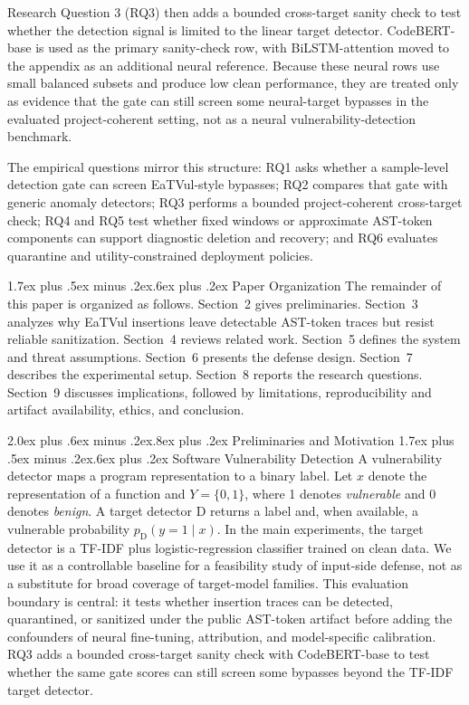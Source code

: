 \documentclass[letterpaper,twocolumn,10pt,twoside]{article}
\makeatletter
\renewcommand\section{\@startsection{section}{1}{\z@}%
  {2.0ex plus .6ex minus .2ex}{.8ex plus .2ex}%
  {\normalfont\large\bfseries}}
\renewcommand\subsection{\@startsection{subsection}{2}{\z@}%
  {1.7ex plus .5ex minus .2ex}{.6ex plus .2ex}%
  {\normalfont\normalsize\bfseries}}
\makeatother
\begin{document}
Research Question 3 (RQ3) then adds a bounded cross-target sanity check to test whether the detection signal is limited to the linear target detector. CodeBERT-base is used as the primary sanity-check row, with BiLSTM-attention moved to the appendix as an additional neural reference. Because these neural rows use small balanced subsets and produce low clean performance, they are treated only as evidence that the gate can still screen some neural-target bypasses in the evaluated project-coherent setting, not as a neural vulnerability-detection benchmark.

The empirical questions mirror this structure: RQ1 asks whether a sample-level detection gate can screen EaTVul-style bypasses; RQ2 compares that gate with generic anomaly detectors; RQ3 performs a bounded project-coherent cross-target check; RQ4 and RQ5 test whether fixed windows or approximate AST-token components can support diagnostic deletion and recovery; and RQ6 evaluates quarantine and utility-constrained deployment policies.

\subsection{Paper Organization}
The remainder of this paper is organized as follows. Section~2 gives preliminaries. Section~3 analyzes why EaTVul insertions leave detectable AST-token traces but resist reliable sanitization. Section~4 reviews related work. Section~5 defines the system and threat assumptions. Section~6 presents the defense design. Section~7 describes the experimental setup. Section~8 reports the research questions. Section~9 discusses implications, followed by limitations, reproducibility and artifact availability, ethics, and conclusion.

\section{Preliminaries and Motivation}
\subsection{Software Vulnerability Detection}
A vulnerability detector maps a program representation to a binary label. Let $x$ denote the representation of a function and $Y = \{0,1\}$, where 1 denotes \textit{vulnerable} and 0 denotes \textit{benign}. A target detector $\mathrm{D}$ returns a label and, when available, a vulnerable probability $p_{\mathrm{D}}(y = 1 \mid x)$. In the main experiments, the target detector is a TF-IDF plus logistic-regression classifier trained on clean data. We use it as a controllable baseline for a feasibility study of input-side defense, not as a substitute for broad coverage of target-model families. This evaluation boundary is central: it tests whether insertion traces can be detected, quarantined, or sanitized under the public AST-token artifact before adding the confounders of neural fine-tuning, attribution, and model-specific calibration. RQ3 adds a bounded cross-target sanity check with CodeBERT-base to test whether the same gate scores can still screen some bypasses beyond the TF-IDF target detector.
\end{document}
